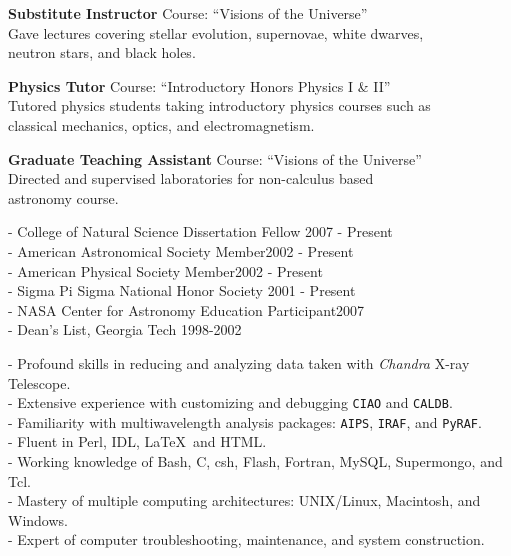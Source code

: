 \documentclass[11pt]{cv}
\begin{document}
\begin{llist}

{\sc \bf{Substitute Instructor}}
Course: ``Visions of the Universe''\\
Gave lectures covering stellar evolution, supernovae, white dwarves,\\
neutron stars, and black holes.

{\sc \bf{Physics Tutor}}
Course: ``Introductory Honors Physics I \& II''\\
Tutored physics students taking introductory physics courses such as\\
classical mechanics, optics, and electromagnetism.

{\sc \bf{Graduate Teaching Assistant}}
Course: ``Visions of the Universe''\\
Directed and supervised laboratories for non-calculus based\\
astronomy course.


- College of Natural Science Dissertation Fellow \hfill 2007 - Present\\
- American Astronomical Society Member\hfill 2002 - Present\\
- American Physical Society Member\hfill 2002 - Present\\
- Sigma Pi Sigma National Honor Society \hfill 2001 - Present\\
- NASA Center for Astronomy Education Participant\hfill 2007\\
- Dean's List, Georgia Tech \hfill 1998-2002


- Profound skills in reducing and analyzing data taken with {\textit{Chandra}} X-ray Telescope.\\
- Extensive experience with customizing and debugging {\tt{CIAO}} and {\tt{CALDB}}.\\
- Familiarity with multiwavelength analysis packages: {\tt{AIPS}}, {\tt{IRAF}}, and {\tt{PyRAF}}.\\
- Fluent in Perl, IDL, \LaTeX\, and HTML.\\
- Working knowledge of Bash, C, csh, Flash, Fortran, MySQL, Supermongo, and Tcl.\\
- Mastery of multiple computing architectures: UNIX/Linux, Macintosh, and Windows.\\
- Expert of computer troubleshooting, maintenance, and system construction.


\end{llist}
\end{document}
